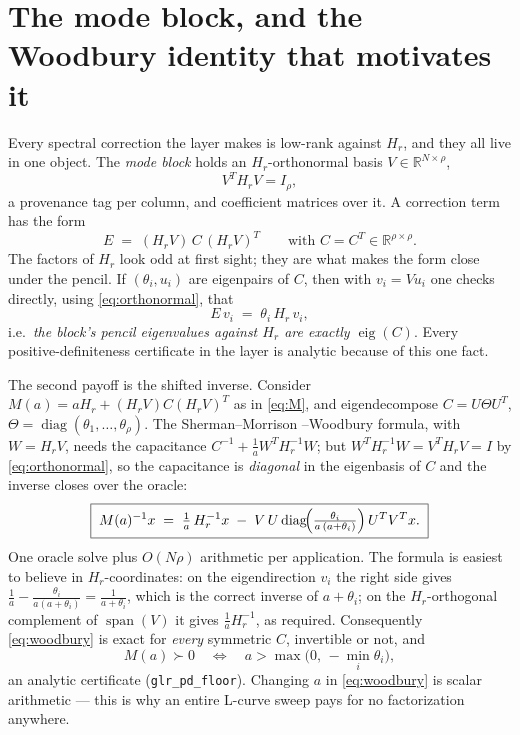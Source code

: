 \documentclass[11pt]{article}
\newcommand{\Hr}{H_r}
\newcommand{\R}{\mathbb{R}}
\begin{document}
\section{The mode block, and the Woodbury identity that motivates it}
\label{sec:block}
\label{sec:woodbury}

Every spectral correction the layer makes is low-rank against $\Hr$, and
they all live in one object. The \emph{mode block} holds an
$\Hr$-orthonormal basis $V \in \R^{N \times \rho}$,
\begin{equation}
  V^T \Hr V = I_\rho,
  \label{eq:orthonormal}
\end{equation}
a provenance tag per column, and coefficient matrices over it. A
correction term has the form
\begin{equation}
  E \;=\; (\Hr V)\, C \,(\Hr V)^T
  \qquad\text{with $C = C^T \in \R^{\rho\times\rho}$.}
  \label{eq:blockform}
\end{equation}
The factors of $\Hr$ look odd at first sight; they are what makes the
form close under the pencil. If $(\theta_i, u_i)$ are eigenpairs of $C$,
then with $v_i = V u_i$ one checks directly, using
\eqref{eq:orthonormal}, that
\begin{equation}
  E\, v_i \;=\; \theta_i\, \Hr\, v_i,
  \label{eq:block-eigs}
\end{equation}
i.e.\ \emph{the block's pencil eigenvalues against $\Hr$ are exactly
$\operatorname{eig}(C)$}. Every positive-definiteness certificate in the
layer is analytic because of this one fact.

The second payoff is the shifted inverse. Consider
$M(a) = a\Hr + (\Hr V) C (\Hr V)^T$ as in \eqref{eq:M}, and
eigendecompose $C = U \Theta U^T$, $\Theta =
\operatorname{diag}(\theta_1, \dots, \theta_\rho)$. The Sherman--Morrison
--Woodbury formula, with $W = \Hr V$, needs the capacitance
$C^{-1} + \tfrac1a W^T \Hr^{-1} W$; but $W^T \Hr^{-1} W = V^T \Hr V = I$
by \eqref{eq:orthonormal}, so the capacitance is \emph{diagonal} in the
eigenbasis of $C$ and the inverse closes over the oracle:
\begin{equation}
  \boxed{\;
  M(a)^{-1} x
  \;=\; \tfrac1a\, \Hr^{-1} x
  \;-\; V\, U \operatorname{diag}\!\Bigl(
        \tfrac{\theta_i}{a\,(a + \theta_i)}\Bigr)\, U^T V^T x.
  \;}
  \label{eq:woodbury}
\end{equation}
One oracle solve plus $O(N\rho)$ arithmetic per application. The formula
is easiest to believe in $\Hr$-coordinates: on the eigendirection $v_i$
the right side gives $\tfrac1a - \tfrac{\theta_i}{a(a+\theta_i)} =
\tfrac1{a+\theta_i}$, which is the correct inverse of $a + \theta_i$; on
the $\Hr$-orthogonal complement of $\operatorname{span}(V)$ it gives
$\tfrac1a \Hr^{-1}$, as required. Consequently \eqref{eq:woodbury} is
exact for \emph{every} symmetric $C$, invertible or not, and
\begin{equation}
  M(a) \succ 0
  \quad\Longleftrightarrow\quad
  a > \max\bigl(0,\, -\min_i \theta_i\bigr),
  \label{eq:glr-floor}
\end{equation}
an analytic certificate (\texttt{glr\_pd\_floor}). Changing $a$ in
\eqref{eq:woodbury} is scalar arithmetic --- this is why an entire L-curve
sweep pays for no factorization anywhere.
\end{document}
